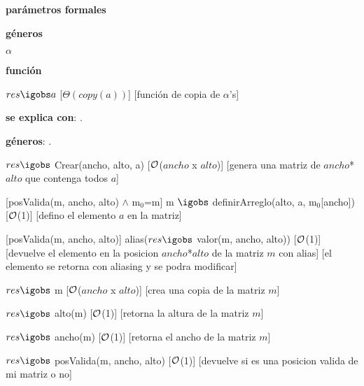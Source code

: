 \begin{Interfaz}

	\textbf{parámetros formales}\parindent\\
	\parbox{1.7cm}{\textbf{géneros}} $\alpha$\\	\parbox[t]{1.7cm}{\textbf{función}}\parbox[t]{\textwidth-2\parindent-1.7cm}{%
	{$res \igobs a$}
	[$\Theta(copy(a))$]
	[función de copia de $\alpha$'s]
	}

	\textbf{se explica con}: .

	\textbf{géneros}: .


	{$res \igobs$ Crear(ancho, alto, a)}
	[$\mathcal{O}$($ancho$ x $alto$)]
	[genera una matriz de $ancho$*$alto$ que contenga todos $a$]

	[posValida(m, ancho, alto) $\land$ m$_0$=m]
	{m $\igobs$ definirArreglo(alto, a, m$_0$[ancho])}%
	[$\mathcal{O}$(1)]
	[defino el elemento $a$ en la matriz]
	
	[posValida(m, ancho, alto)]
	{alias($res \igobs$ valor(m, ancho, alto))}
	[$\mathcal{O}$(1)]
	[devuelve el elemento en la posicion $ancho$*$alto$ de la matriz $m$ con alias]
	[el elemento se retorna con aliasing y se podra modificar]

	{$res \igobs$ m}  
	[$\mathcal{O}$($ancho$ x $alto$)]
	[crea una copia de la matriz $m$]

	{$res \igobs$ alto(m)}  
	[$\mathcal{O}$(1)]
	[retorna la altura de la matriz $m$]

	{$res \igobs$ ancho(m)}  
	[$\mathcal{O}$(1)]
	[retorna el ancho de la matriz $m$]

	{$res \igobs$ posValida(m, ancho, alto)}  
	[$\mathcal{O}$(1)]
	[devuelve si es una posicion valida de mi matriz o no]
	
\end{Interfaz}

